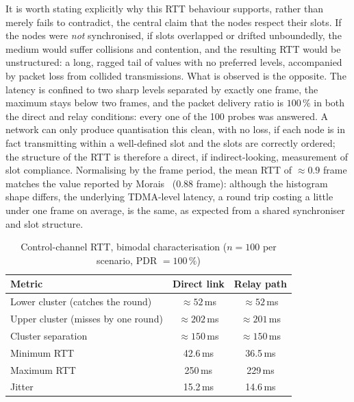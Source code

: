 It is worth stating explicitly why this RTT behaviour supports, rather than
merely fails to contradict, the central claim that the nodes respect their
slots. If the nodes were \emph{not} synchronised, if slots overlapped or
drifted unboundedly, the medium would suffer collisions and contention, and
the resulting RTT would be unstructured: a long, ragged tail of values with no
preferred levels, accompanied by packet loss from collided transmissions.
What is observed is the opposite. The latency is confined to two sharp levels
separated by exactly one frame, the maximum stays below two frames, and the
packet delivery ratio is $100\,\%$ in both the direct and relay conditions:
every one of the 100 probes was answered. A network can only produce
quantisation this clean, with no loss, if each node is in fact transmitting
within a well-defined slot and the slots are correctly ordered; the structure
of the RTT is therefore a direct, if indirect-looking, measurement of slot
compliance. Normalising by the frame period, the mean RTT of $\approx 0.9$
frame matches the value reported by Morais~\cite{morais2024synchronization}
(0.88 frame): although the histogram shape differs, the underlying
TDMA-level latency, a round trip costing a little under one frame on average,  is the same, as expected from a shared synchroniser and slot structure.

\begin{table}[h]
\centering
\caption{Control-channel RTT, bimodal characterisation
($n = 100$ per scenario, PDR $= 100\,\%$)}
\label{tab:rtt}
\begin{tabular}{lcc}
\toprule
\textbf{Metric} & \textbf{Direct link} & \textbf{Relay path} \\
\midrule
Lower cluster (catches the round)   & $\approx 52$\,ms  & $\approx 52$\,ms  \\
Upper cluster (misses by one round) & $\approx 202$\,ms & $\approx 201$\,ms \\
Cluster separation                  & $\approx 150$\,ms & $\approx 150$\,ms \\
Minimum RTT                         & 42.6\,ms          & 36.5\,ms          \\
Maximum RTT                         & 250\,ms           & 229\,ms           \\
Jitter                              & 15.2\,ms          & 14.6\,ms          \\
\bottomrule
\end{tabular}
\end{table}

